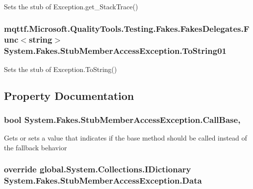 Sets the stub of Exception.\-get\-\_\-\-Stack\-Trace()

\hypertarget{class_system_1_1_fakes_1_1_stub_member_access_exception_a25221c9ccfd5d0d888a110282aee36e2}{
\subsubsection[{To\-String01}]{\setlength{\rightskip}{0pt plus 5cm}mqttf.\-Microsoft.\-Quality\-Tools.\-Testing.\-Fakes.\-Fakes\-Delegates.\-Func$<$string$>$ System.\-Fakes.\-Stub\-Member\-Access\-Exception.\-To\-String01}}\label{class_system_1_1_fakes_1_1_stub_member_access_exception_a25221c9ccfd5d0d888a110282aee36e2}


Sets the stub of Exception.\-To\-String()



\subsection{Property Documentation}
\hypertarget{class_system_1_1_fakes_1_1_stub_member_access_exception_a84c94ad4248713a5962502f11e656e87}{
\subsubsection[{Call\-Base}]{\setlength{\rightskip}{0pt plus 5cm}bool System.\-Fakes.\-Stub\-Member\-Access\-Exception.\-Call\-Base\hspace{0.3cm}{\ttfamily [get]}, {\ttfamily [set]}}}\label{class_system_1_1_fakes_1_1_stub_member_access_exception_a84c94ad4248713a5962502f11e656e87}


Gets or sets a value that indicates if the base method should be called instead of the fallback behavior

\hypertarget{class_system_1_1_fakes_1_1_stub_member_access_exception_ae911c8b831f36023a540d6911d002030}{
\subsubsection[{Data}]{\setlength{\rightskip}{0pt plus 5cm}override global.\-System.\-Collections.\-I\-Dictionary System.\-Fakes.\-Stub\-Member\-Access\-Exception.\-Data\hspace{0.3cm}{\ttfamily [get]}}}\label{class_system_1_1_fakes_1_1_stub_member_access_exception_ae911c8b831f36023a540d6911d002030}


